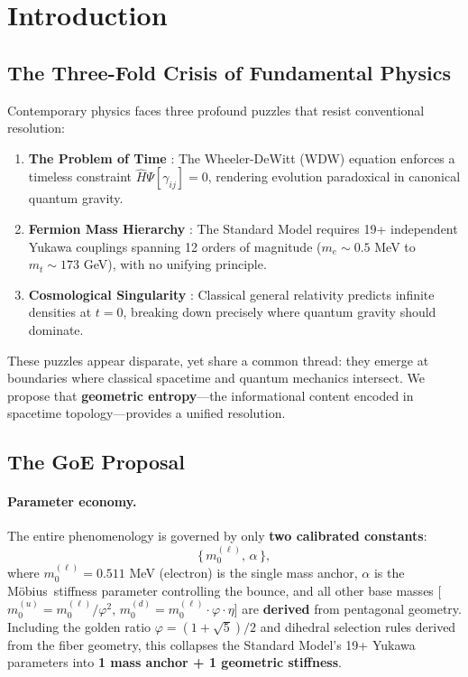 \documentclass[12pt]{article}
\newcommand{\Moebius}{M\"obius}
\newcommand{\SigMoeb}{\Sigma\text{--}\Moebius}
\begin{document}
\clearpage

\section{Introduction}

\subsection{The Three-Fold Crisis of Fundamental Physics}

Contemporary physics faces three profound puzzles that resist conventional resolution:

\begin{enumerate}
\item \textbf{The Problem of Time} \cite{wheeler1968}: The Wheeler-DeWitt (WDW) equation enforces a timeless constraint $\hat{H} \Psi[\gamma_{ij}] = 0$, rendering evolution paradoxical in canonical quantum gravity.

\item \textbf{Fermion Mass Hierarchy} \cite{pdg2024}: The Standard Model requires 19+ independent Yukawa couplings spanning 12 orders of magnitude ($m_e \sim 0.5$ MeV to $m_t \sim 173$ GeV), with no unifying principle.

\item \textbf{Cosmological Singularity} \cite{hawking1970}: Classical general relativity predicts infinite densities at $t = 0$, breaking down precisely where quantum gravity should dominate.
\end{enumerate}

These puzzles appear disparate, yet share a common thread: they emerge at boundaries where classical spacetime and quantum mechanics intersect. We propose that \textbf{geometric entropy}—the informational content encoded in spacetime topology—provides a unified resolution.

\subsection{The GoE Proposal}

\paragraph{Parameter economy.} The entire phenomenology is governed by only \textbf{two calibrated constants}:
\begin{equation}
\{\,m_{0}^{(\ell)},\,\alpha\,\},
\end{equation}
where $m_0^{(\ell)} = 0.511$ MeV (electron) is the single mass anchor, $\alpha$ is the \SigMoeb\ stiffness parameter controlling the bounce, and all other base masses [$m_0^{(u)} = m_0^{(\ell)}/\varphi^2$, $m_0^{(d)} = m_0^{(\ell)} \cdot \varphi \cdot \eta$] are \textbf{derived} from pentagonal geometry. Including the golden ratio $\varphi=(1+\sqrt{5})/2$ and dihedral selection rules derived from the fiber geometry, this collapses the Standard Model's 19+ Yukawa parameters into \textbf{1 mass anchor + 1 geometric stiffness}.
\end{document}
